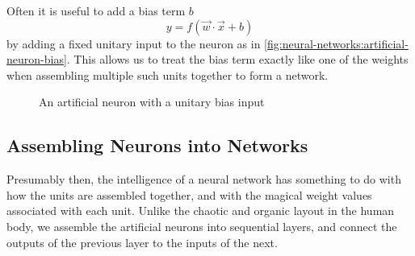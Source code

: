 Often it is useful to add a bias term $b$
\begin{equation}
    y = f(\vec w \cdot \vec x + b) \label{eq:neural-networks:ffnn-unit}
\end{equation}
by adding a fixed unitary input to the neuron as in \autoref{fig:neural-networks:artificial-neuron-bias}.
This allows us to treat the bias term exactly like one of the weights when assembling multiple such units together to form a network.
\begin{figure}[h]
    \centering
    \caption{An artificial neuron with a unitary bias input}\label{fig:neural-networks:artificial-neuron-bias}
\end{figure}

\subsection{Assembling Neurons into Networks}\label{sec:neural-networks:assembling-neurons}

Presumably then, the intelligence of a neural network has something to do with how the units are assembled together, and with the magical weight values associated with each unit.
Unlike the chaotic and organic layout in the human body, we assemble the artificial neurons into sequential layers, and connect the outputs of the previous layer to the inputs of the next.

